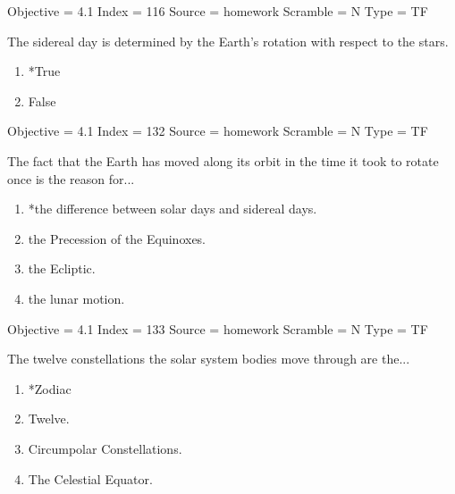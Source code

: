 \documentclass[11pt]{article}
\begin{document}
\begin{enumerate}
\begin{minipage}{\textwidth}
\begin{minipage}{\textwidth}
Objective = 4.1
Index = 116
Source = homework
Scramble = N
Type = TF
\end{minipage}
\end{minipage}
\vskip 0.20in

\begin{minipage}{\textwidth}
\begin{minipage}{\textwidth}
\item The sidereal day is determined by the Earth's rotation with respect to the stars.
\begin{multicols}{3}
\begin{enumerate} 
\setlength{\itemsep}{1pt} 
\setlength{\parskip}{0pt} 
\setlength{\parsep}{0pt}
\setlength{\multicolsep}{1pt} 
\item *True
\item False
\end{enumerate} 
\vfill 
\end{multicols}

Objective = 4.1
Index = 132
Source = homework
Scramble = N
Type = TF
\end{minipage}
\end{minipage}
\vskip 0.20in

\begin{minipage}{\textwidth}
\begin{minipage}{\textwidth}
\item The fact that the Earth has moved along its orbit in the time it took to rotate once is the reason for...
\begin{enumerate} 
\setlength{\itemsep}{1pt} 
\setlength{\parskip}{0pt} 
\setlength{\parsep}{0pt}
\setlength{\multicolsep}{1pt} 
\item *the difference between solar days and sidereal days.
\item the Precession of the Equinoxes.
\item the Ecliptic.
\item the lunar motion.
\end{enumerate} 
Objective = 4.1
Index = 133
Source = homework
Scramble = N
Type = TF
\end{minipage}
\end{minipage}
\vskip 0.20in

\begin{minipage}{\textwidth}
\begin{minipage}{\textwidth}
\item The twelve constellations the solar system bodies move through are the...
\begin{multicols}{2}
\begin{enumerate} 
\setlength{\itemsep}{1pt} 
\setlength{\parskip}{0pt} 
\setlength{\parsep}{0pt}
\setlength{\multicolsep}{1pt} 
\item *Zodiac
\item Twelve.
\item Circumpolar Constellations.
\item The Celestial Equator.
\end{enumerate} 
\vfill 
\end{multicols}


\end{minipage}
\end{minipage}
\end{enumerate}
\end{document}
